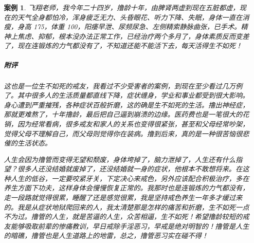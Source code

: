 \documentclass{ctexart}
\newtheorem{case}{案例}
\begin{document}
\begin{case}
    飞翔老师，我今年二十四岁，撸龄十年，由脾肾两虚到现在五脏都虚，现在的天气全身都怕冷，浑身疲乏无力、头昏眼花、听力下降、失眠，身体一直在消瘦，身高 175，体重 100，阳痿早泄、尿频尿急、左侧精索静脉曲张，已手术。精神上焦虑、抑郁，根本没办法正常工作，已经治疗两个多月了，身体素质反而变差了，现在连锻炼的力气都没有了，不知道还能不能活下去，每天活得生不如死！
    \subparagraph{附评} 这也是一位生不如死的戒友，我看过不少受害者的案例，到现在至少看过几万例了。其中很多人的生活质量都直线下降，症状缠身，学业和事业都受到很大影响。身心遭到严重摧残，各种症状百般折磨，这的确是生不如死的生活。撸出神经症，那就更难熬了，十年撸龄，最后把自己逼到崩溃的边缘。医药费也是一笔很大的花销，因为经常看病，很多戒友和家人的关系也变得很紧张，甚至和父母经常吵架，觉得父母不理解自己，而父母则觉得你在装病。撸到后来，真的是一种很苦恼很悲催的生活状态。

    人生会因为撸管而变得无望和颓废，身体垮掉了，脑力泄掉了，人生还有什么指望？很多人还没结婚就废掉了，还没结婚就一身的症状，他根本不敢想将来。在这种人生的低谷，一定要咬紧牙关，下定决心来戒色，另外应该配合积极治疗，多在养生方面下功夫，这样身体会慢慢恢复正常的。我那时也是连锻炼的力气都没有，走一段路就觉得很累，睡醒了还是感觉很累，我是坚持戒色养生一年多才缓过来的。我是从症状地狱爬回来的人，我太清楚那是怎样的痛苦和折磨，生不如死一点不为过。撸管的人生，就是苦逼的人生，众苦相逼，生不如死！希望撸龄较短的戒友能够吸取前辈的惨痛教训，早日戒除手淫恶习，早戒是绝对明智的！撸管是人生的暗礁，撸管也是人生道路上的地雷，总之，撸管恶习实在碰不得！
\end{case}
\end{document}
